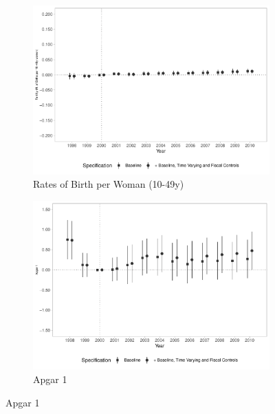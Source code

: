 \begin{figure}[h!]
    \begin{center}
    \caption{Effects on Fertility and Birth Outcomes}\label{fig:19}
    \begin{subfigure}{0.32\textwidth}
        \caption{\scriptsize Rates of Birth per Woman (10-49y)}\label{fig:19a}
        \centering
        \includegraphics[width=\textwidth]{plots/birth_fertility_dist_ec29_baseline_dist_ec29_baseline_19.pdf}
    \end{subfigure}
    \begin{subfigure}{0.32\textwidth}
        \centering
        \caption{\scriptsize Apgar 1}\label{fig:19b}
        \includegraphics[width=\textwidth]{plots/birth_apgar1_dist_ec29_baseline_dist_ec29_baseline_19.pdf}
    \end{subfigure}

\end{center}
\end{figure}

